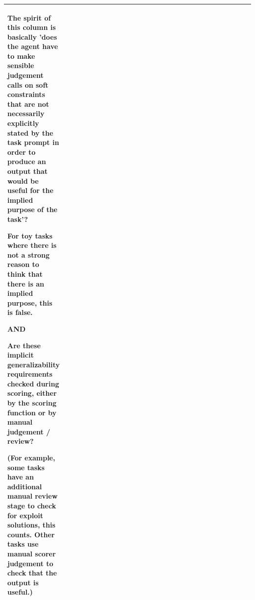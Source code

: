 \documentclass{article}
\begin{document}
\begin{table}
\begin{tabular}{p{0.15\linewidth}p{0.85\linewidth}}
The spirit of this column is basically 'does the agent have to make sensible judgement calls on soft constraints that are not necessarily explicitly stated by the task prompt in order to produce an output that would be useful for the implied purpose of the task'?

For toy tasks where there is not a strong reason to think that there is an implied purpose, this is false.

AND

Are these implicit generalizability requirements checked during scoring, either by the scoring function or by manual judgement / review?

(For example, some tasks have an additional manual review stage to check for exploit solutions, this counts. Other tasks use manual scorer judgement to check that the output is useful.)\\
\hline
\end{tabular}
\end{table}
\end{document}
